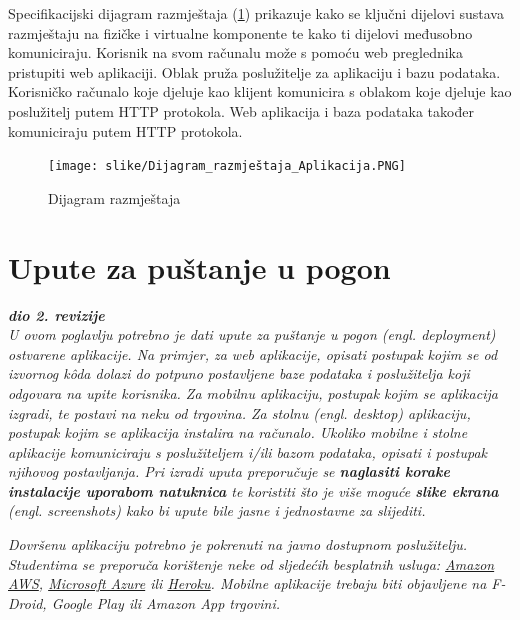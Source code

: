 			 Specifikacijski dijagram razmještaja (\ref{fig:dijagram_razmjestaja1}) prikazuje kako se ključni dijelovi sustava razmještaju na fizičke i virtualne komponente te kako ti dijelovi međusobno komuniciraju.
			 Korisnik na svom računalu može s pomoću web preglednika pristupiti web aplikaciji. Oblak pruža poslužitelje za aplikaciju i bazu podataka. Korisničko računalo koje djeluje kao klijent komunicira s oblakom koje djeluje kao poslužitelj putem HTTP protokola. Web aplikacija i baza podataka također komuniciraju putem HTTP protokola.
			 
			 \begin{figure}[H]
				\texttt{[image: slike/Dijagram\_razmještaja\_Aplikacija.PNG]} %
				\centering
				\caption{Dijagram razmještaja}
				\label{fig:dijagram_razmjestaja1}
			\end{figure}
			
			\eject 
		
		\section{Upute za puštanje u pogon}
		
			\textbf{\textit{dio 2. revizije}}\\
		
			 \textit{U ovom poglavlju potrebno je dati upute za puštanje u pogon (engl. deployment) ostvarene aplikacije. Na primjer, za web aplikacije, opisati postupak kojim se od izvornog kôda dolazi do potpuno postavljene baze podataka i poslužitelja koji odgovara na upite korisnika. Za mobilnu aplikaciju, postupak kojim se aplikacija izgradi, te postavi na neku od trgovina. Za stolnu (engl. desktop) aplikaciju, postupak kojim se aplikacija instalira na računalo. Ukoliko mobilne i stolne aplikacije komuniciraju s poslužiteljem i/ili bazom podataka, opisati i postupak njihovog postavljanja. Pri izradi uputa preporučuje se \textbf{naglasiti korake instalacije uporabom natuknica} te koristiti što je više moguće \textbf{slike ekrana} (engl. screenshots) kako bi upute bile jasne i jednostavne za slijediti.}
			
			
			 \textit{Dovršenu aplikaciju potrebno je pokrenuti na javno dostupnom poslužitelju. Studentima se preporuča korištenje neke od sljedećih besplatnih usluga: \href{https://aws.amazon.com/}{Amazon AWS}, \href{https://azure.microsoft.com/en-us/}{Microsoft Azure} ili \href{https://www.heroku.com/}{Heroku}. Mobilne aplikacije trebaju biti objavljene na F-Droid, Google Play ili Amazon App trgovini.}
			
			
			\eject 